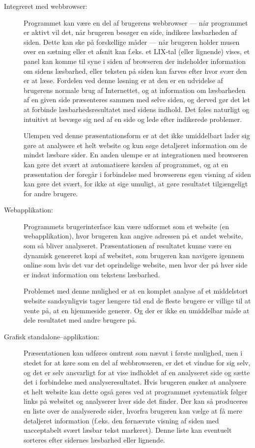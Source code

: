\documentclass[a4paper,oneside]{memoir}
\begin{document}
\begin{description}
\item[Integreret med webbrowser:]
  Programmet kan være en del af brugerens webbrowser --- når
  programmet er aktivt vil det, når brugeren besøger en side, indikere
  læsbarheden af siden. Dette kan ske på forskellige måder --- når
  brugeren holder musen over en sætning eller et afsnit kan f.eks. et
  LIX-tal (eller lignende) vises, et panel kan komme til syne i siden
  af browseren der indeholder information om sidens læsbarhed, eller
  teksten på siden kan farves efter hvor svær den er at læse. Fordelen
  ved denne løsning er at den er en udvidelse af brugerens normale
  brug af Internettet, og at information om læsbarheden af en given
  side præsenteres sammen med selve siden, og derved gør det let at
  forbinde læsbarhedsresultatet med sidens indhold. Det føles
  naturligt og intuitivt at bevæge sig ned af en side og lede efter
  indikerede problemer. 

  Ulempen ved denne præsentationsform er at det ikke umiddelbart lader
  sig gøre at analysere et helt website og kun søge detaljeret
  information om de mindst læsbare sider. En anden ulempe er at
  integrationen med browseren kan gøre det svært at automatisere
  kørslen af programmet, og at en præsentation der foregår i
  forbindelse med browserens egen visning af siden kan gøre det svært,
  for ikke at sige umuligt, at gøre resultatet tilgængeligt for andre
  brugere.

\item[Webapplikation:]
  Programmets brugerinterface kan være udformet som et website (en
  webapplikation), hvor brugeren kan angive adressen på et andet
  website, som så bliver analyseret. Præsentationen af resultatet
  kunne være en dynamisk genereret kopi af websitet, som brugeren kan
  navigere igennem online som hvis det var det oprindelige website,
  men hvor der på hver side er indsat information om tekstens
  læsbarhed. 

  Problemet med denne mulighed er at en komplet analyse af et
  middelstort website sandsynligvis tager længere tid end de fleste
  brugere er villige til at vente på, at en hjemmeside generer. Og der er ikke
  en umiddelbar måde at dele resultatet med andre brugere på.

\item[Grafisk standalone--applikation:] 
  Præsentationen kan udføres omtrent som nævnt i første mulighed, men
  i stedet for at køre som en del af webbrowseren, er det et vindue
  for sig selv, og det er selv ansvarligt for at vise indholdet af en
  analyseret side og sætte det i forbindelse med
  analyseresultatet. Hvis brugeren ønsker at analysere et helt website
  kan dette også gøres ved at programmet systematisk følger links på
  websitet og analyserer hver side det finder. Der kan så produceres
  en liste over de analyserede sider, hvorfra brugeren kan vælge at få
  mere detaljeret information (f.eks. den førnævnte visning af siden
  med uacceptabelt svært læsbar tekst markeret). Denne liste kan
  eventuelt sorteres efter sidernes læsbarhed eller lignende.


\end{description}
\end{document}
